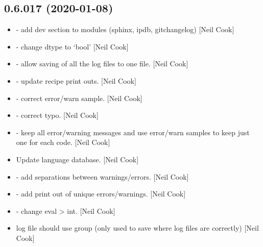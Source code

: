 \documentclass[a4paper,10pt,english]{report}
\begin{document}
\subsection{0.6.017 (2020-01-08)}
\label{\detokenize{misc/changelog:id2}}\begin{itemize}
\item {} 
 - add dev section to modules (sphinx, ipdb,
gitchangelog) {[}Neil Cook{]}

\item {} 
 - change dtype to
‘bool’ {[}Neil Cook{]}

\item {} 
 - allow saving of all the log
files to one file. {[}Neil Cook{]}

\item {} 
 - update recipe print outs.
{[}Neil Cook{]}

\item {} 
 - correct error/warn sample.
{[}Neil Cook{]}

\item {} 
 - correct typo. {[}Neil Cook{]}

\item {} 
 - keep all error/warning
messages and use error/warn samples to keep just one for each code.
{[}Neil Cook{]}

\item {} 
Update language database. {[}Neil Cook{]}

\item {} 
 - add separations between
warnings/errors. {[}Neil Cook{]}

\item {} 
 - add print out of unique
errors/warnings. {[}Neil Cook{]}

\item {} 
 - change eval \textendash{}\textgreater{} int. {[}Neil
Cook{]}

\item {} 
 log file should use group (only used to save where log
files are correctly) {[}Neil Cook{]}


\end{itemize}
\end{document}
